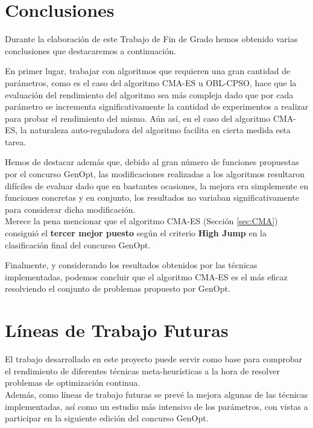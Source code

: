 
\section{Conclusiones}

Durante la elaboración de este Trabajo de Fin de Grado hemos obtenido varias conclusiones que destacaremos a continuación.

En primer lugar, trabajar con algoritmos que requieren una gran cantidad de parámetros, como es el caso del algoritmo CMA-ES u OBL-CPSO, hace que la evaluación del rendimiento del algoritmo sea más compleja dado que por cada parámetro se incrementa significativamente la cantidad de experimentos a realizar para probar el rendimiento del mismo. Aún así, en el caso del algoritmo CMA-ES, la naturaleza auto-reguladora del algoritmo facilita en cierta medida esta tarea. 

Hemos de destacar además que, debido al gran número de funciones propuestas por el concurso GenOpt, las modificaciones realizadas a los algoritmos resultaron difíciles de evaluar dado que en bastantes ocasiones, la mejora era simplemente en funciones concretas y en conjunto, los resultados no variaban significativamente para considerar dicha modificación.\\

Merece la pena mencionar que el algoritmo CMA-ES (Sección \ref{sec:CMA}) consiguió el \textbf{tercer mejor puesto} según el criterio \textbf{High Jump} en la clasificación final del concurso GenOpt.

Finalmente, y considerando los resultados obtenidos por las técnicas implementadas, podemos concluir que el algoritmo CMA-ES es el más eficaz resolviendo el conjunto de problemas propuesto por GenOpt.


\section{Líneas de Trabajo Futuras}

El trabajo desarrollado en este proyecto puede servir como base para comprobar el rendimiento de diferentes técnicas meta-heurísticas a la hora de resolver problemas de optimización continua. \\
Además, como líneas de trabajo futuras se prevé la mejora algunas de las técnicas implementadas, así como un estudio más intensivo de los parámetros, con vistas a participar en la siguiente edición del concurso GenOpt.
